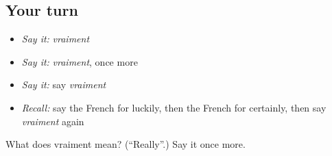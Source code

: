 \subsection*{Your turn}
\begin{itemize}
\raggedright
  \item \emph{Say it:} \emph{vraiment}
  \item \emph{Say it:} \emph{vraiment}, once more
  \item \emph{Say it:} say \emph{vraiment}
  \item \emph{Recall:} say the French for luckily, then the French for certainly, then say \emph{vraiment} again
\end{itemize}

\begin{tcolorbox}[breakable,colback=teal!4,colframe=teal!35!black,title={Before you move on}]
What does vraiment mean? (\textquotedblleft{}Really\textquotedblright{}.) Say it once more.
\end{tcolorbox}
